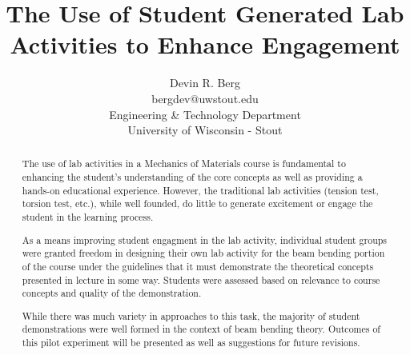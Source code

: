 \documentclass[12pt]{article}
\title{\large The Use of Student Generated Lab Activities to Enhance Engagement}
\author{\normalsize Devin R. Berg\\\normalsize bergdev@uwstout.edu\\\normalsize Engineering \& Technology Department\\\normalsize University of Wisconsin - Stout}
\date{}
\begin{document}
\maketitle



\begin{abstract}
The use of lab activities in a Mechanics of Materials course is fundamental to enhancing the student's understanding of the core concepts as well as providing a hands-on educational experience. However, the traditional lab activities (tension test, torsion test, etc.), while well founded, do little to generate excitement or engage the student in the learning process.

As a means improving student engagment in the lab activity, individual student groups were granted freedom in designing their own lab activity for the beam bending portion of the course under the guidelines that it must demonstrate the theoretical concepts presented in lecture in some way. Students were assessed based on relevance to course concepts and quality of the demonstration.

While there was much variety in approaches to this task, the majority of student demonstrations were well formed in the context of beam bending theory. Outcomes of this pilot experiment will be presented as well as suggestions for future revisions.
\end{abstract}
\end{document}
